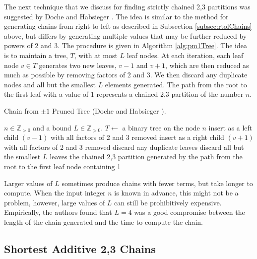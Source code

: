 \documentclass{ucalgthes1}
\theoremstyle{definition}
\newcommand{\ZZgtz}{\mathbb{Z}_{>0}}
\begin{document}
The next technique that we discuss for finding strictly chained 2,3 partitions was suggested by Doche and Habsieger \cite{Doche2008}. The idea is similar to the method for generating chains from right to left as described in Subsection \ref{subsec:rtolChains} above, but differs by generating multiple values that may be further reduced by powers of 2 and 3. The procedure is given in Algorithm \ref{alg:pm1Tree}.  The idea is to maintain a tree, $T$, with at most $L$ leaf nodes. At each iteration, each leaf node $v \in T$ generates two new leaves, $v-1$ and $v+1$, which are then reduced as much as possible by removing factors of 2 and 3.  We then discard any duplicate nodes and all but the smallest $L$ elements generated. The path from the root to the first leaf with a value of 1 represents a chained 2,3 partition of the number $n$.

\begin{algorithm}[htb]
\caption{Chain from $\pm 1$ Pruned Tree (Doche and Habsieger \cite{Doche2008}).}
\label{alg:pm1Tree}
\begin{algorithmic}[1]
\Require $n \in \ZZgtz$ and a bound $L \in \ZZgtz$.
\State $T \gets$ a binary tree on the node $n$
		\State insert as a left child $(v - 1)$ with all factors of 2 and 3 removed
		\State insert as a right child $(v + 1)$ with all factors of 2 and 3 removed
	\EndFor
	\State discard any duplicate leaves
	\State discard all but the smallest $L$ leaves
\EndWhile
\State \Return the chained 2,3 partition generated by the path from the root to the first leaf node containing 1
\end{algorithmic}
\end{algorithm}

Larger values of $L$ sometimes produce chains with fewer terms, but take longer to compute.  When the input integer $n$ is known in advance, this might not be a problem, however, large values of $L$ can still be prohibitively expensive.  Empirically, the authors found that $L=4$ was a good compromise between the length of the chain generated and the time to compute the chain. 


\subsection{Shortest Additive 2,3 Chains}
\label{subsec:shortAddChains}
\end{document}
